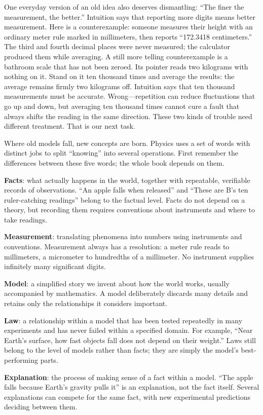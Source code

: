 One everyday version of an old idea also deserves dismantling: ``The finer the measurement, the better.'' Intuition says that reporting more digits means better measurement. Here is a counterexample: someone measures their height with an ordinary meter rule marked in millimeters, then reports ``172.3418 centimeters.'' The third and fourth decimal places were never measured; the calculator produced them while averaging. A still more telling counterexample is a bathroom scale that has not been zeroed. Its pointer reads two kilograms with nothing on it. Stand on it ten thousand times and average the results: the average remains firmly two kilograms off. Intuition says that ten thousand measurements must be accurate. Wrong---repetition can reduce fluctuations that go up and down, but averaging ten thousand times cannot cure a fault that always shifts the reading in the same direction. These two kinds of trouble need different treatment. That is our next task.


Where old models fall, new concepts are born. Physics uses a set of words with distinct jobs to split ``knowing'' into several operations. First remember the differences between these five words; the whole book depends on them.

\begin{mainline}
\textbf{Facts}: what actually happens in the world, together with repeatable, verifiable records of observations. ``An apple falls when released'' and ``These are B's ten ruler-catching readings'' belong to the factual level. Facts do not depend on a theory, but recording them requires conventions about instruments and where to take readings.

\textbf{Measurement}: translating phenomena into numbers using instruments and conventions. Measurement always has a resolution: a meter rule reads to millimeters, a micrometer to hundredths of a millimeter. No instrument supplies infinitely many significant digits.

\textbf{Model}: a simplified story we invent about how the world works, usually accompanied by mathematics. A model deliberately discards many details and retains only the relationships it considers important.

\textbf{Law}: a relationship within a model that has been tested repeatedly in many experiments and has never failed within a specified domain. For example, ``Near Earth's surface, how fast objects fall does not depend on their weight.'' Laws still belong to the level of models rather than facts; they are simply the model's best-performing parts.

\textbf{Explanation}: the process of making sense of a fact within a model. ``The apple falls because Earth's gravity pulls it'' is an explanation, not the fact itself. Several explanations can compete for the same fact, with new experimental predictions deciding between them.
\end{mainline}

